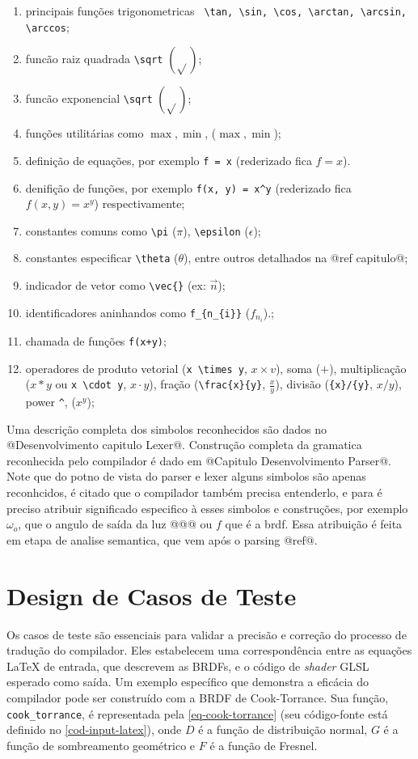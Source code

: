 \label{subconjunto-latex-equantion} \begin{enumerate}
  \item principais funções trigonometricas \verb" \tan, \sin, \cos, \arctan, \arcsin, \arccos";

\item funcão raiz quadrada \verb"\sqrt" $\left(\sqrt{}\right)$;
\item funcão exponencial \verb"\sqrt" $\left(\sqrt{}\right)$;
\item funções utilitárias como $\max, \min$, ($\max, \min$);
\item definição de equações, por exemplo \verb"f = x" (rederizado fica $f = x$).
\item denifição de funções, por exemplo  \verb"f(x, y) = x^y" (rederizado fica $f(x, y) = x^y$) respectivamente;
\item constantes comuns como \verb"\pi" ($\pi$), \verb"\epsilon" ($\epsilon$);
\item constantes especificar \verb"\theta" ($\theta$), entre outros detalhados na @ref capitulo@;
\item indicador de vetor como \verb"\vec{}" (ex: $\vec{n}$);
\item identificadores aninhandos como \verb"f_{n_{i}}" ($f_{n_{i}}$).;
\item chamada de funções \verb"f(x+y)";
\item operadores de produto vetorial (\verb"x \times y", $x \times v$), soma ($+$), multiplicação ($x*y$ ou \verb"x \cdot y", $x \cdot y$), fração (\verb"\frac{x}{y}", $\frac{x}{y}$), divisão (\verb"{x}/{y}", ${x}/{y}$), power \verb"^", ($x^y$);

\end{enumerate}

Uma descrição completa dos simbolos reconhecidos são dados no @Desenvolvimento capitulo Lexer@. Construção completa da gramatica reconhecida pelo compilador é dado em @Capitulo Desenvolvimento Parser@. Note que do potno de vista do parser e lexer alguns simbolos são apenas reconhcidos, é citado que o compilador também precisa entenderlo, e para é preciso atribuir significado especifico à esses simbolos e construções, por exemplo $\omega_o$, que o angulo de saída da luz @@@ ou $f$ que é a brdf. Essa atribuição é feita em etapa de analise semantica, que vem após o parsing @ref@.

%
%
\section{Design de Casos de Teste} \label{testes}
%
%
Os casos de teste são essenciais para validar a precisão e correção do processo de tradução do compilador. Eles estabelecem uma correspondência entre as equações \LaTeX{} de entrada, que descrevem as BRDFs, e o código de \textit{shader} GLSL esperado como saída. Um exemplo específico que demonstra a eficácia do compilador pode ser construído com a BRDF de Cook-Torrance. Sua função, \texttt{cook\_torrance}, é representada pela \autoref{eq-cook-torrance} (seu código-fonte está definido no \autoref{cod-input-latex}), onde \(D\) é a função de distribuição normal, \(G\) é a função de sombreamento geométrico e \(F\) é a função de Fresnel.

